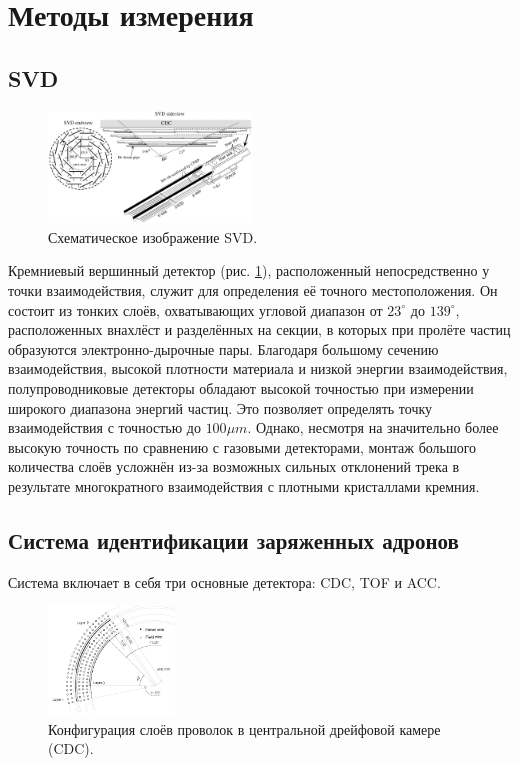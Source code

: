 \section{Методы измерения}
\subsection{SVD}

\begin{figure}
    \centering
    \includegraphics[width=0.48\textwidth]{img/SVD.png}
    \caption{Схематическое изображение SVD.}
    \label{the:SVD}
\end{figure}

Кремниевый вершинный детектор (рис. \ref{the:SVD}), расположенный непосредственно у точки взаимодействия, 
служит для определения её точного местоположения. Он состоит из тонких слоёв, охватывающих угловой диапазон от $23^\circ$ до $139^\circ$, 
расположенных внахлёст и разделённых на секции, в которых при пролёте частиц 
образуются электронно-дырочные пары. Благодаря большому сечению взаимодействия, 
высокой плотности материала и низкой энергии взаимодействия, полупроводниковые 
детекторы обладают высокой точностью при измерении широкого диапазона энергий частиц.
Это позволяет определять точку взаимодействия с точностью до $100\mu m$. 
Однако, несмотря на значительно более высокую точность по сравнению с газовыми детекторами, 
монтаж большого количества слоёв усложнён из-за возможных сильных отклонений 
трека в результате многократного взаимодействия с плотными кристаллами кремния.

\subsection{Система идентификации заряженных адронов}

Система включает в себя три основные детектора: CDC, TOF и ACC.

\begin{figure}
    \centering
    \includegraphics[width=0.3\textwidth]{img/CDC.png}
    \caption{Конфигурация слоёв проволок в центральной дрейфовой камере (CDC).}
    \label{the:CDC}
\end{figure}

